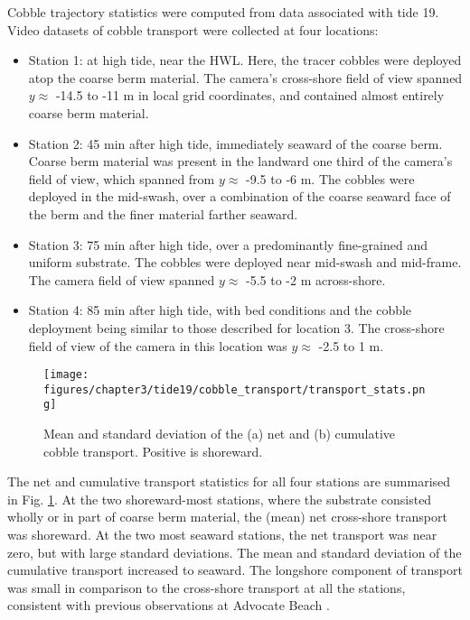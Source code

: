 Cobble trajectory statistics were computed from data associated with tide 19. Video datasets of cobble transport were collected at four locations: 

\begin{itemize}
	\item Station 1: at high tide, near the HWL. Here, the tracer cobbles were deployed atop the coarse berm material. The camera's cross-shore field of view spanned $y\approx$ -14.5 to -11 m in local grid coordinates, and contained almost entirely coarse berm material. 
	\item Station 2: 45 min after high tide, immediately seaward of the coarse berm. Coarse berm material was present in the landward one third of the camera's field of view, which spanned from $y\approx$ -9.5 to -6 m. The cobbles were deployed in the mid-swash, over a combination of the coarse seaward face of the berm and the finer material farther seaward. 
	\item Station 3: 75 min after high tide, over a predominantly fine-grained and uniform substrate. The cobbles were deployed near mid-swash and mid-frame. The camera field of view spanned $y\approx$ -5.5 to -2 m across-shore. 
	\item Station 4: 85 min after high tide, with bed conditions and the cobble deployment being similar to those described for location 3. The cross-shore field of view of the camera in this location was $y\approx$ -2.5 to 1 m.
\end{itemize}	

\begin{figure}[tbp] %
  	\texttt{[image: figures/chapter3/tide19/cobble\_transport/transport\_stats.png]} 	
 	\caption[Net and cumulative cobble transport]{Mean and standard deviation of the (a) net and (b) cumulative cobble transport. Positive is shoreward.}
 	\label{fig:cobble_transport_stats}
\end{figure}

The net and cumulative transport statistics for all four stations are summarised in Fig. \ref{fig:cobble_transport_stats}. At the two shoreward-most stations, where the substrate consisted wholly or in part of coarse berm material, the (mean) net cross-shore transport was shoreward. At the two most seaward stations, the net transport was near zero, but with large standard deviations. The mean and standard deviation of the cumulative transport increased to seaward. The longshore component of transport was small in comparison to the cross-shore transport at all the stations, consistent with previous observations at Advocate Beach \citep[e.g.,][]{Stark_Hay2016}. 

